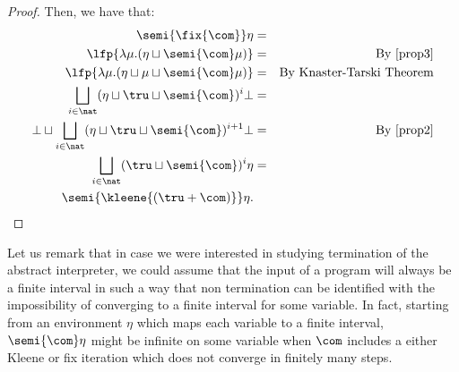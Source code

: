 \begin{proof}
  Then, we have that:
  \begin{align*}
    \semi{\fix{\com}} \eta & = \\
    \lfp{\lambda \mu. (\eta \sqcup \semi{\com} \mu)} & = &  \text{By \eqref{prop3}}\\
    \lfp{\lambda \mu. (\eta \sqcup \mu \sqcup \semi{\com} \mu)} & = & \text{By Knaster-Tarski Theorem} \\
    \bigsqcup_{i \in \nat} (\eta \sqcup \tru \sqcup \semi{\com})^i \bot & = \\
    \bot \sqcup \bigsqcup_{i \in \nat} (\eta \sqcup \tru \sqcup \semi{\com})^{i+1} \bot & = & \text{By \eqref{prop2}}\\
    \bigsqcup_{i \in \nat} (\tru \sqcup \semi{\com})^{i} \eta & = \\
    \semi{\kleene{(\tru + \com)}} \eta. &
  \end{align*}  
\end{proof}

\begin{remark}
  Let us remark that in case we were interested in studying
  termination of the abstract interpreter, we could assume that the
  input of a program will always be a finite interval in such a way
  that non termination can be identified with the impossibility of
  converging to a finite interval for some variable. In fact, starting
  from an environment \(\eta\) which maps each variable to a finite
  interval, \(\semi{\com}\eta\) might be infinite on some variable
  when \(\com\) includes a either Kleene or fix iteration which does
  not converge in finitely many steps.
\end{remark}